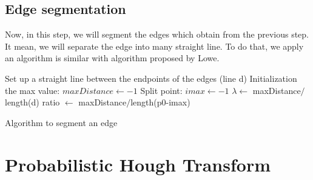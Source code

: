 \subsection{Edge segmentation}
Now, in this step, we will segment the edges which obtain from the previous step. It mean, we will separate the edge into many straight line. To do that, we apply an algorithm is similar with algorithm proposed by Lowe.\\
\IncMargin{1em}
\begin{algorithm}[H]
\Indm 
{}
\Indp
Set up a straight line between the endpoints of the edges (line d)\;
Initialization the max value: $maxDistance  \leftarrow -1 $\;
Split point: $imax \leftarrow -1$ \; 
$\lambda \leftarrow $ maxDistance$/$length(d)\;
ratio $ \leftarrow $ maxDistance$/$length(p0-imax)\;
\caption{Algorithm to segment an edge}
\end{algorithm}\DecMargin{1em}
\section{Probabilistic Hough Transform}